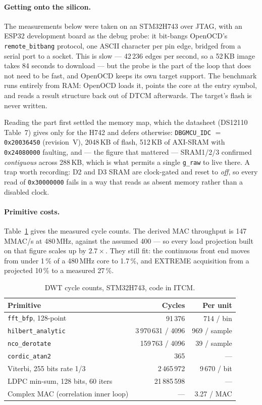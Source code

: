 \paragraph{Getting onto the silicon.}
The measurements below were taken on an STM32H743 over JTAG, with an
ESP32 development board as the debug probe: it bit-bangs OpenOCD's
\texttt{remote\_bitbang} protocol, one ASCII character per pin edge,
bridged from a serial port to a socket. This is slow --- 42\,236 edges
per second, so a 52\,KB image takes 84 seconds to download --- but the
probe is the part of the loop that does not need to be fast, and
OpenOCD keeps its own target support. The benchmark runs entirely from
RAM: OpenOCD loads it, points the core at the entry symbol, and reads a
result structure back out of DTCM afterwards. The target's flash is
never written.

Reading the part first settled the memory map, which the datasheet
(DS12110 Table~7) gives only for the H742 and defers otherwise:
\texttt{DBGMCU\_IDC} $=$ \texttt{0x20036450} (revision~V), 2048\,KB of
flash, 512\,KB of AXI-SRAM with \texttt{0x24080000} faulting, and ---
the figure that mattered --- SRAM1/2/3 confirmed \emph{contiguous}
across 288\,KB, which is what permits a single \texttt{g\_raw} to live
there. A trap worth recording: D2 and D3 SRAM are clock-gated and reset
to \emph{off}, so every read of \texttt{0x30000000} fails in a way that
reads as absent memory rather than a disabled clock.

\paragraph{Primitive costs.}
Table~\ref{tab:cport_cycles} gives the measured cycle counts. The
derived MAC throughput is 147\,MMAC/s at 480\,MHz, against the assumed
400 --- so every load projection built on that figure scales up by
$2.7\times$. They still fit: the continuous front end moves from under
1\,\% of a 480\,MHz core to 1.7\,\%, and EXTREME acquisition from a
projected 10\,\% to a measured 27\,\%.

\begin{table}[htbp]
    \centering
    \caption{DWT cycle counts, STM32H743, code in ITCM.}
    \label{tab:cport_cycles}
    \small
    \begin{tabular}{@{}lrr@{}}
    \toprule
    \textbf{Primitive} & \textbf{Cycles} & \textbf{Per unit} \\
    \midrule
    \texttt{fft\_bfp}, 128-point & 91\,376 & 714 / bin \\
    \texttt{hilbert\_analytic} & 3\,970\,631 / 4096 & 969 / sample \\
    \texttt{nco\_derotate} & 159\,763 / 4096 & 39 / sample \\
    \texttt{cordic\_atan2} & 365 & --- \\
    Viterbi, 255 bits rate 1/3 & 2\,465\,972 & 9\,670 / bit \\
    LDPC min-sum, 128 bits, 60 iters & 21\,885\,598 & --- \\
    Complex MAC (correlation inner loop) & --- & 3.27 / MAC \\
    \bottomrule
    \end{tabular}
\end{table}


